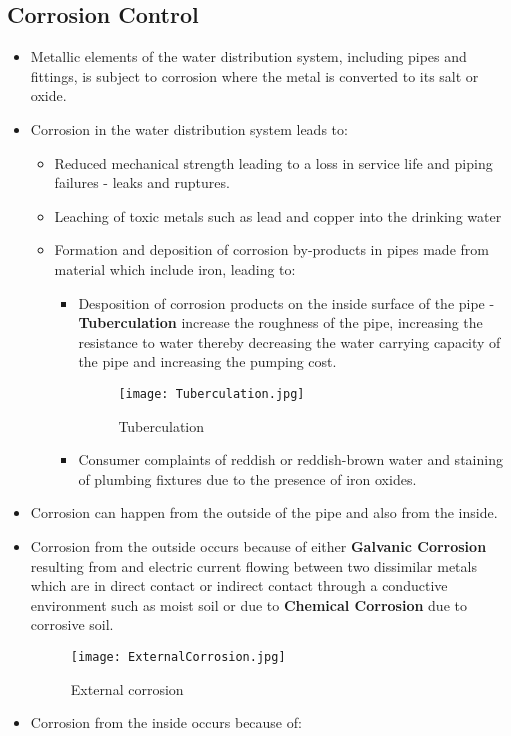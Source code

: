 \subsection{Corrosion Control} 
\begin{itemize}
\item Metallic elements of the water distribution system, including pipes and fittings, is subject to corrosion where the metal is converted to its salt or oxide.
\item Corrosion in the water distribution system leads to:

\begin{itemize}
\item Reduced mechanical strength leading to a loss in service life and piping failures - leaks and ruptures.
\item Leaching of toxic metals such as lead and copper into the drinking water
\item Formation and deposition of corrosion by-products in pipes made from material which include iron, leading to:

\begin{itemize}
\item Desposition of corrosion products on the inside surface of the pipe - \textbf{Tuberculation}   increase the roughness of the pipe, increasing the resistance to water thereby decreasing the water carrying capacity of the pipe and increasing the pumping cost.
\begin{figure}[h]
			      	\begin{center}
			      		\texttt{[image: Tuberculation.jpg]}\\
			      		\caption{Tuberculation}
			      	\end{center}
\end{figure}
\item  Consumer complaints of reddish or reddish-brown water and staining of plumbing fixtures due to the presence of iron oxides.
\end{itemize}

\end{itemize}

\item Corrosion can happen from the outside of the pipe and also from the inside.
\item Corrosion from the outside occurs because of either \textbf{Galvanic Corrosion}  resulting from and electric current flowing between two dissimilar metals which are in direct contact or indirect contact through a conductive environment such as moist soil or due to \textbf{Chemical Corrosion} due to corrosive soil.
\begin{figure}[H]
			      	\begin{center}
			      		\texttt{[image: ExternalCorrosion.jpg]}\\
			      		\caption{External corrosion}
			      	\end{center}
\end{figure} 
\item Corrosion from the inside occurs because of:



\end{itemize}
